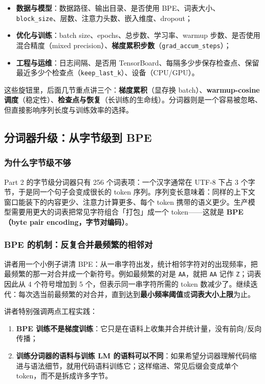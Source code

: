 \begin{itemize}
\item \textbf{数据与模型}：数据路径、输出目录、是否使用 BPE、词表大小、\texttt{block\_size}、层数、注意力头数、嵌入维度、dropout；
\item \textbf{优化与训练}：batch size、epochs、总步数、学习率、warmup 步数、是否使用混合精度（mixed precision）、\textbf{梯度累积步数}（\texttt{grad\_accum\_steps}）；
\item \textbf{工程与运维}：日志间隔、是否用 TensorBoard、每隔多少步保存检查点、保留最近多少个检查点（\texttt{keep\_last\_k}）、设备（CPU/GPU）。
\end{itemize}

这些旋钮里，后面几节重点讲三个：\textbf{梯度累积}（显存换 batch）、\textbf{warmup-cosine 调度}（稳定性）、\textbf{检查点与恢复}（长训练的生命线）。分词器则是一个容易被忽略、但直接影响序列长度与训练效率的选择。

\subsection{分词器升级：从字节级到 BPE}

\subsubsection{为什么字节级不够}

Part 2 的字节级分词器只有 256 个词表项：一个汉字通常在 UTF-8 下占 3 个字节，于是同一个句子会变成很长的 token 序列。序列变长意味着：同样的上下文窗口能装下的内容更少、注意力计算更多、每个 token 携带的语义更少。生产模型需要用更大的词表把常见字符组合「打包」成一个 token——这就是 \textbf{BPE（byte pair encoding，字节对编码）}。

\subsubsection{BPE 的机制：反复合并最频繁的相邻对}

讲者用一个小例子讲清 BPE：从一串字符出发，统计相邻字符对的出现频率，把最频繁的那一对合并成一个新符号。例如最频繁的对是 \texttt{AA}，就把 \texttt{AA} 记作 \texttt{Z}；词表因此从 4 个符号增加到 5 个，但表示同一串字符所需的 token 数减少了。继续迭代：每次选当前最频繁的对合并，直到达到\textbf{最小频率阈值}或\textbf{词表大小上限}为止。

讲者特别强调两点工程实践：

\begin{enumerate}
\item \textbf{BPE 训练不是梯度训练}：它只是在语料上收集并合并统计量，没有前向/反向传播；
\item \textbf{训练分词器的语料与训练 LM 的语料可以不同}：如果希望分词器理解代码缩进与语法细节，就用代码语料训练它；这样缩进、常见后缀会变成单个 token，而不是拆成许多字节。
\end{enumerate}

